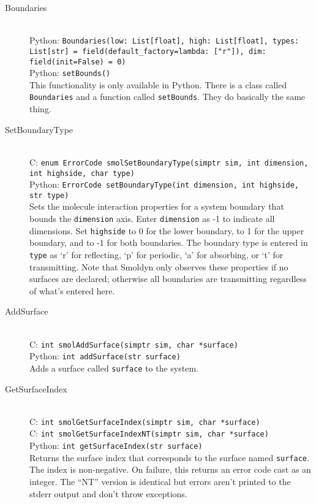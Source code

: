 \documentclass {book}
\newcommand {\ttt} {\texttt}
\begin{document}
\begin{description}

\item[Boundaries]
\hfill \\
Python: \ttt{Boundaries(low: List[float], high: List[float], types: List[str] = field(default\_factory=lambda: ["r"]), dim: field(init=False) = 0)}\\
Python: \ttt{setBounds()}\\
This functionality is only available in Python. There is a class called \ttt{Boundaries} and a function called \ttt{setBounds}. They do basically the same thing.

\item[SetBoundaryType]
\hfill \\
C: \ttt{enum ErrorCode smolSetBoundaryType(simptr sim, int dimension, int highside, char type)}\\
Python: \ttt{ErrorCode setBoundaryType(int dimension, int highside, str type)}\\
Sets the molecule interaction properties for a system boundary that bounds the \ttt{dimension} axis. Enter \ttt{dimension} as -1 to indicate all dimensions. Set \ttt{highside} to 0 for the lower boundary, to 1 for the upper boundary, and to -1 for both boundaries. The boundary type is entered in \ttt{type} as `r' for reflecting, `p' for periodic, `a' for absorbing, or `t' for transmitting. Note that Smoldyn only observes these properties if no surfaces are declared; otherwise all boundaries are transmitting regardless of what's entered here.

\item[AddSurface]
\hfill \\
C: \ttt{int smolAddSurface(simptr sim, char *surface)}\\
Python: \ttt{int addSurface(str surface)}\\
Adds a surface called \ttt{surface} to the system.

\item[GetSurfaceIndex]
\hfill \\
C: \ttt{int smolGetSurfaceIndex(simptr sim, char *surface)}\\
C: \ttt{int smolGetSurfaceIndexNT(simptr sim, char *surface)}\\
Python: \ttt{int getSurfaceIndex(str surface)}\\
Returns the surface index that corresponds to the surface named \ttt{surface}. The index is non-negative. On failure, this returns an error code cast as an integer. The ``NT'' version is identical but errors aren't printed to the stderr output and don't throw exceptions.


\end{description}
\end{document}
